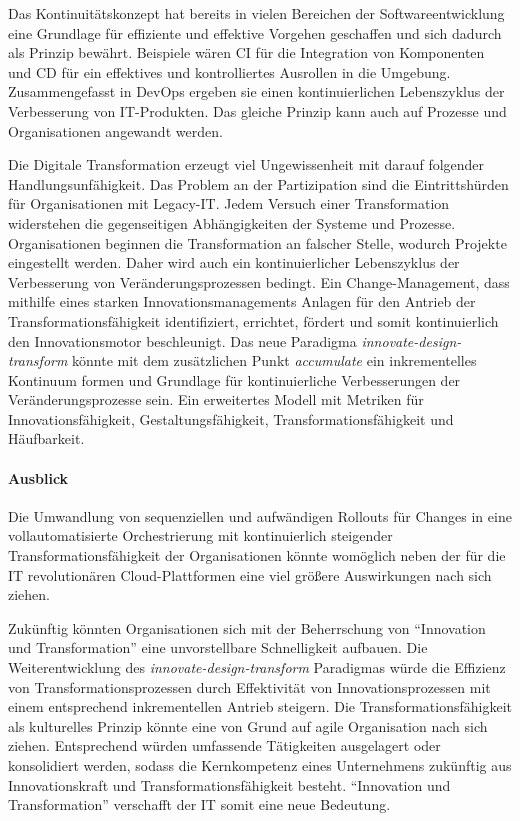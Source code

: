 Das Kontinuitätskonzept hat bereits in vielen Bereichen der Softwareentwicklung eine Grundlage für effiziente und effektive Vorgehen geschaffen und sich dadurch als Prinzip bewährt. Beispiele wären \ac{CI} für die Integration von Komponenten und \ac{CD} für ein effektives und kontrolliertes Ausrollen in die Umgebung. Zusammengefasst in DevOps ergeben sie einen kontinuierlichen Lebenszyklus der Verbesserung von IT-Produkten. Das gleiche Prinzip kann auch auf Prozesse und Organisationen angewandt werden.

Die Digitale Transformation erzeugt viel Ungewissenheit mit darauf folgender Handlungsunfähigkeit. Das Problem an der Partizipation sind die Eintrittshürden für Organisationen mit Legacy-IT. Jedem Versuch einer Transformation widerstehen die gegenseitigen Abhängigkeiten der Systeme und Prozesse. Organisationen beginnen die Transformation an falscher Stelle, wodurch Projekte eingestellt werden. Daher wird auch ein kontinuierlicher Lebenszyklus der Verbesserung von Veränderungsprozessen bedingt. Ein Change-Management, dass mithilfe eines starken Innovationsmanagements Anlagen für den Antrieb der Transformationsfähigkeit identifiziert, errichtet, fördert und somit kontinuierlich den Innovationsmotor beschleunigt.
Das neue Paradigma \emph{innovate-design-transform} könnte mit dem zusätzlichen Punkt \emph{accumulate} ein inkrementelles Kontinuum formen und Grundlage für kontinuierliche Verbesserungen der Veränderungsprozesse sein. Ein erweitertes Modell mit Metriken für Innovationsfähigkeit, Gestaltungsfähigkeit, Transformationsfähigkeit und Häufbarkeit.

\paragraph{Ausblick}

Die Umwandlung von sequenziellen und aufwändigen Rollouts für Changes in eine vollautomatisierte Orchestrierung mit kontinuierlich steigender Transformationsfähigkeit der Organisationen könnte womöglich neben der für die IT revolutionären Cloud-Plattformen eine viel größere Auswirkungen nach sich ziehen. 

Zukünftig könnten Organisationen sich mit der Beherrschung von \enquote{Innovation und Transformation} eine unvorstellbare Schnelligkeit aufbauen.
Die Weiterentwicklung des \emph{innovate-design-transform} Paradigmas würde die Effizienz von Transformationsprozessen durch Effektivität von Innovationsprozessen mit einem entsprechend inkrementellen Antrieb steigern. Die Transformationsfähigkeit als kulturelles Prinzip könnte eine von Grund auf agile Organisation nach sich ziehen. Entsprechend würden umfassende Tätigkeiten ausgelagert oder konsolidiert werden, sodass die Kernkompetenz eines Unternehmens zukünftig aus Innovationskraft und Transformationsfähigkeit besteht. \enquote{Innovation und Transformation} verschafft der IT somit eine neue Bedeutung.